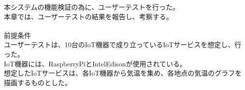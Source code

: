 本システムの機能検証の為に、ユーザーテストを行った。\\
本章では、ユーザーテストの結果を報告し、考察する。\\
\\
前提条件\\
ユーザーテストは、10台のIoT機器で成り立っているIoTサービスを想定し、行った。\\
IoT機器には、RaspberryPiとIntelEdisonが使用されている。\\
想定したIoTサービスは、各IoT機器から気温を集め、各地点の気温のグラフを描画するものとした。


